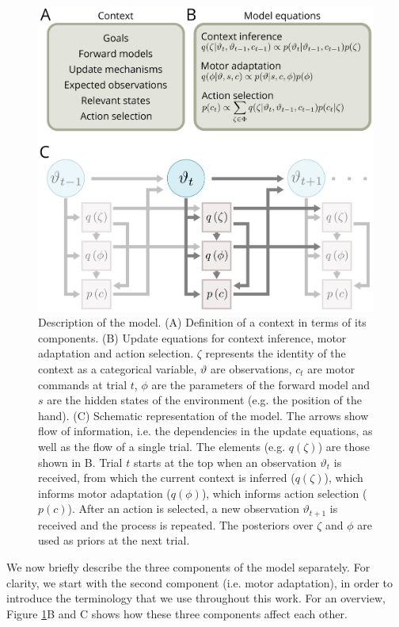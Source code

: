 \documentclass[a4paper,doc,floatsintext,natbib]{apa6}
\def \fref #1{Figure \ref{#1}}     %
\begin{document}
\begin{figure}
\centering
\includegraphics[]{./figures/figure_1.png}
\caption{Description of the model. (A) Definition of a context in terms of its components. (B) Update equations for context inference, motor adaptation and action selection. $\zeta$ represents the identity of the context as a categorical variable, $\vartheta$ are observations, $c_t$ are motor commands at trial $t$, $\phi$ are the parameters of the forward model and $s$ are the hidden states of the environment (e.g. the position of the hand). (C) Schematic representation of the model. The arrows show flow of information, i.e. the dependencies in the update equations, as well as the flow of a single trial. The elements (e.g. $q(\zeta)$) are those shown in B. Trial $t$ starts at the top when an observation $\vartheta_t$ is received, from which the current context is inferred ($q(\zeta)$), which informs motor adaptation ($q(\phi)$), which informs action selection ($p(c)$). After an action is selected, a new observation $\vartheta_{t+1}$ is received and the process is repeated. The posteriors over $\zeta$ and $\phi$ are used as priors at the next trial.}
\label{fig:model}
\end{figure}

We now briefly describe the three components of the model separately. For clarity, we start with the second component (i.e. motor adaptation), in order to introduce the terminology that we use throughout this work. For an overview, \fref{fig:model}B and C shows how these three components affect each other.
\end{document}
